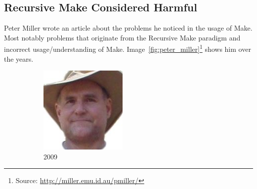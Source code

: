 \subsection{Recursive Make Considered Harmful}
\label{sec:recursivemake}
Peter Miller wrote an article about the problems he noticed in the usage of Make\cite{miller1998recursive}. Most notably problems that originate from the Recursive Make paradigm and incorrect usage/understanding of Make.
Image~\ref{fig:peter_miller}\footnote{Source: \url{http://miller.emu.id.au/pmiller/}} shows him over the years.
\begin{figure} \centering
\captionsetup[subfigure]{labelformat=empty}
\begin{subfigure}{0.19\textwidth}
\includegraphics[width=\textwidth]{images/peter_miller_2009.jpg}
\caption{2009}
\end{subfigure}
\begin{subfigure}{0.19\textwidth}

\end{subfigure}
\end{figure}

